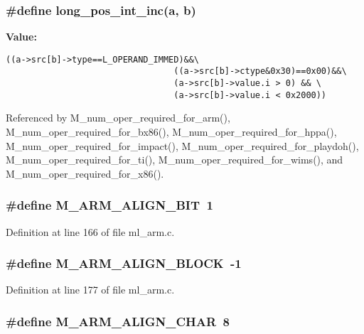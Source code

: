 \subsubsection{\setlength{\rightskip}{0pt plus 5cm}\#define long\_\-pos\_\-int\_\-inc(a, b)}\label{ml__arm_8c_686ce721d793dfad41d2f06f1d9bd1df}


\textbf{Value:}

\begin{Code}\begin{verbatim}((a->src[b]->type==L_OPERAND_IMMED)&&\
                                 ((a->src[b]->ctype&0x30)==0x00)&&\
                                 (a->src[b]->value.i > 0) && \
                                 (a->src[b]->value.i < 0x2000))
\end{verbatim}\end{Code}


Referenced by M\_\-num\_\-oper\_\-required\_\-for\_\-arm(), M\_\-num\_\-oper\_\-required\_\-for\_\-bx86(), M\_\-num\_\-oper\_\-required\_\-for\_\-hppa(), M\_\-num\_\-oper\_\-required\_\-for\_\-impact(), M\_\-num\_\-oper\_\-required\_\-for\_\-playdoh(), M\_\-num\_\-oper\_\-required\_\-for\_\-ti(), M\_\-num\_\-oper\_\-required\_\-for\_\-wims(), and M\_\-num\_\-oper\_\-required\_\-for\_\-x86().
\subsubsection{\setlength{\rightskip}{0pt plus 5cm}\#define M\_\-ARM\_\-ALIGN\_\-BIT~1}\label{ml__arm_8c_9b3e2ccf45f71615e5b0565812824c32}




Definition at line 166 of file ml\_\-arm.c.
\subsubsection{\setlength{\rightskip}{0pt plus 5cm}\#define M\_\-ARM\_\-ALIGN\_\-BLOCK~-1}\label{ml__arm_8c_eb5884427974e87c1a567da66f146d95}




Definition at line 177 of file ml\_\-arm.c.
\subsubsection{\setlength{\rightskip}{0pt plus 5cm}\#define M\_\-ARM\_\-ALIGN\_\-CHAR~8}\label{ml__arm_8c_400b5639a5f26bba9414552639cdd30a}




